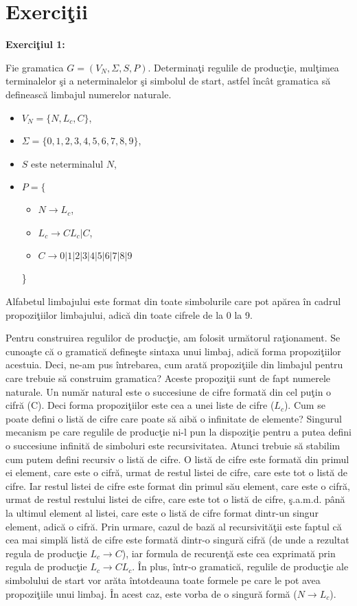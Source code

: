 \section{Exerciţii}

\textbf{Exerciţiul 1:}

Fie gramatica $G = (V_{N}, \Sigma, S, P)$. Determinaţi regulile de producţie, mulţimea terminalelor şi a neterminalelor şi simbolul de start, astfel încât gramatica să definească limbajul numerelor naturale.
\begin{itemize}
\item
$V_{N} = \{N,L_c,C\}$,
\item
$\Sigma = \{0,1,2,3,4,5,6,7,8,9\}$,
\item
$S$ este neterminalul $N$, 
\item
$P = \{$
\begin{itemize}
\item
$N \rightarrow L_c$,
\item
$L_c \rightarrow CL_c | C$,
\item
$C \rightarrow 0|1|2|3|4|5|6|7|8|9$
\end{itemize}
\}
\end{itemize}

Alfabetul limbajului este format din toate simbolurile care pot apărea în cadrul propoziţiilor limbajului, adică din toate cifrele de la 0 la 9.

Pentru construirea regulilor de producţie, am folosit următorul raţionament. Se cunoaşte că o gramatică defineşte sintaxa unui limbaj, adică forma propoziţiilor acestuia. Deci, ne-am pus întrebarea, cum arată propoziţiile din limbajul pentru care trebuie să construim gramatica? Aceste propoziţii sunt de fapt numerele naturale. Un număr natural este o succesiune de cifre formată din cel puţin o cifră (C). Deci forma propoziţiilor este cea a unei liste de cifre ($L_c$). Cum se poate defini o listă de cifre care poate să aibă o infinitate de elemente? Singurul mecanism pe care regulile de producţie ni-l pun la dispoziţie pentru a putea defini o succesiune infinită de simboluri este recursivitatea. Atunci trebuie să stabilim cum putem defini recursiv o listă de cifre. O listă de cifre este formată din primul ei element, care este o cifră, urmat de restul listei de cifre, care este tot o listă de cifre. Iar restul listei de cifre este format din primul său element, care este o cifră, urmat de restul restului listei de cifre, care este tot o listă de cifre, ş.a.m.d. până la ultimul element al listei, care este o listă de cifre format dintr-un singur element, adică o cifră. Prin urmare, cazul de bază al recursivităţii este faptul că cea mai simplă listă de cifre este formată dintr-o singură cifră (de unde a rezultat regula de producţie $L_c \rightarrow C$), iar formula de recurenţă este cea exprimată prin regula de producţie $L_c \rightarrow CL_c$. În plus, într-o gramatică, regulile de producţie ale simbolului de start vor arăta întotdeauna toate formele pe care le pot avea propoziţiile unui limbaj. În acest caz, este vorba de o singură formă ($N \rightarrow L_c$).


